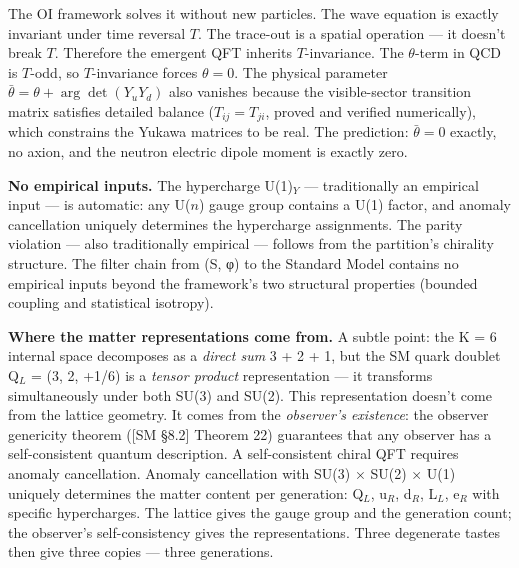 \documentclass[
]{article}
\begin{document}
The OI framework solves it without new particles. The wave equation is
exactly invariant under time reversal \(T\). The trace-out is a spatial
operation --- it doesn't break \(T\). Therefore the emergent QFT
inherits \(T\)-invariance. The \(\theta\)-term in QCD is \(T\)-odd, so
\(T\)-invariance forces \(\theta = 0\). The physical parameter
\(\bar{\theta} = \theta + \arg\det(Y_u Y_d)\) also vanishes because the
visible-sector transition matrix satisfies detailed balance
(\(T_{ij} = T_{ji}\), proved and verified numerically), which constrains
the Yukawa matrices to be real. The prediction: \(\bar{\theta} = 0\)
exactly, no axion, and the neutron electric dipole moment is exactly
zero.

\textbf{No empirical inputs.} The hypercharge U(1)\(_Y\) ---
traditionally an empirical input --- is automatic: any U(\(n\)) gauge
group contains a U(1) factor, and anomaly cancellation uniquely
determines the hypercharge assignments. The parity violation --- also
traditionally empirical --- follows from the partition's chirality
structure. The filter chain from (S, φ) to the Standard Model contains
no empirical inputs beyond the framework's two structural properties
(bounded coupling and statistical isotropy).

\textbf{Where the matter representations come from.} A subtle point: the
K = 6 internal space decomposes as a \emph{direct sum} 3 + 2 + 1, but
the SM quark doublet Q\(_L\) = (3, 2, +1/6) is a \emph{tensor product}
representation --- it transforms simultaneously under both SU(3) and
SU(2). This representation doesn't come from the lattice geometry. It
comes from the \emph{observer's existence}: the observer genericity
theorem ({[}SM §8.2{]} Theorem 22) guarantees that any observer has a
self-consistent quantum description. A self-consistent chiral QFT
requires anomaly cancellation. Anomaly cancellation with SU(3) × SU(2) ×
U(1) uniquely determines the matter content per generation: Q\(_L\),
u\(_R\), d\(_R\), L\(_L\), e\(_R\) with specific hypercharges. The
lattice gives the gauge group and the generation count; the observer's
self-consistency gives the representations. Three degenerate tastes then
give three copies --- three generations.
\end{document}
